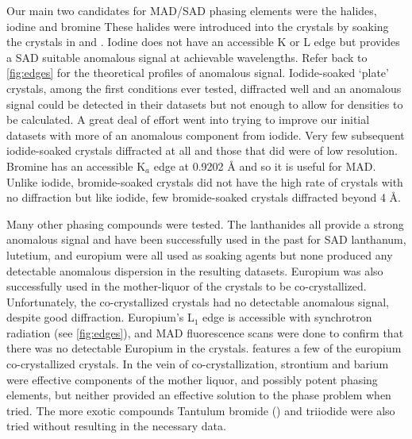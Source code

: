 Our main two candidates for \ac{MAD}/\ac{SAD} phasing elements were the halides,
iodine and  bromine These halides were introduced
into the crystals by soaking the crystals in  and . Iodine does
not have an accessible K or L edge but provides a \ac{SAD}  suitable anomalous
signal at achievable wavelengths. Refer back to \cref{fig:edges} for the
theoretical profiles of anomalous signal. Iodide-soaked `plate' crystals, among
the first conditions ever tested, diffracted well and an anomalous signal could be detected in their datasets but not enough to allow for densities to be calculated. A great deal of effort went into trying to improve our initial datasets with more of an anomalous component from iodide. Very few subsequent iodide-soaked crystals diffracted at all  and those that did were of low resolution. Bromine has an accessible K$_{a}$ edge at 0.9202 \AA{} and so it is useful for \ac{MAD}. Unlike iodide, bromide-soaked crystals did not have the high rate of crystals  with no diffraction but like iodide, few bromide-soaked crystals diffracted beyond 4 \AA{}. 

Many other phasing compounds were tested. The lanthanides all provide a strong
anomalous signal and have been successfully used in the past for
\ac{SAD} lanthanum, lutetium, and europium were all
used as soaking agents but none produced any detectable anomalous dispersion in
the resulting datasets. Europium was also successfully used in the mother-liquor
of the crystals to be co-crystallized. Unfortunately, the co-crystallized
crystals had no detectable anomalous signal, despite good diffraction.
Europium's L$_{1}$ edge is accessible with synchrotron radiation (see
\cref{fig:edges}), and \ac{MAD} fluorescence scans were done to confirm that there was no detectable Europium in the crystals.  features a few of the europium co-crystallized crystals. In the vein of co-crystallization, strontium and barium were effective components of the mother liquor, and possibly potent phasing elements, but neither provided an effective solution to the phase problem when tried. The more exotic compounds Tantulum bromide () and  triiodide were also tried without resulting in the necessary data. 
 
